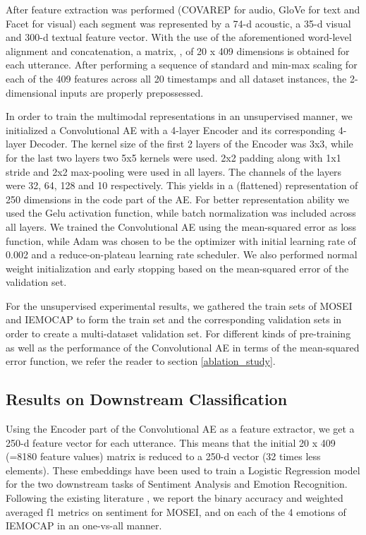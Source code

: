 After feature extraction was performed (COVAREP \cite{degottex2014covarep} for audio, GloVe \cite{pennington2014glove} for text and Facet \cite{imotions} for visual) each segment was represented by a 74-d acoustic, a 35-d visual and 300-d textual feature vector. With the use of the aforementioned word-level alignment and concatenation, a matrix, , of 20 x 409 dimensions is obtained for each utterance. After performing a sequence of standard and min-max scaling for each of the 409 features across all 20 timestamps and all dataset instances, the 2-dimensional inputs are properly prepossessed.

In order to train the multimodal representations in an unsupervised manner, we initialized a Convolutional AE with a 4-layer Encoder and its corresponding 4-layer Decoder. The kernel size of the first 2 layers of the Encoder was 3x3, while for the last two layers two 5x5 kernels were used. 2x2 padding along with 1x1 stride and 2x2 max-pooling were used in all layers. The channels of the layers were 32, 64, 128 and 10 respectively. This yields in a (flattened)  representation of 250 dimensions in the code part of the AE. For better representation ability we used the Gelu activation function, while batch normalization was included across all layers. We trained the Convolutional AE using the mean-squared error as loss function, while Adam was chosen to be the optimizer with initial learning rate of 0.002 and a reduce-on-plateau learning rate scheduler. We also performed normal weight initialization and early stopping based on the mean-squared error of the validation set.

For the unsupervised experimental results, we gathered the train sets of MOSEI and IEMOCAP to form the train set and the corresponding validation sets in order to create a multi-dataset validation set. For different kinds of pre-training as well as the performance of the Convolutional AE in terms of the mean-squared error function, we refer the reader to section \ref{ablation_study}.

\subsection{Results on Downstream Classification}


Using the Encoder part of the Convolutional AE as a feature extractor, we get a 250-d feature vector for each utterance. This means that the initial 20 x 409 (=8180 feature values) matrix is reduced to a 250-d vector (32 times less elements). These embeddings have been used to train a Logistic Regression model for the two downstream tasks of Sentiment Analysis and Emotion Recognition. Following the existing literature \cite{zadeh2018multi, zadeh2018memory, zadeh2017tensor, wang2019words, zadeh2018multimodal, liu2018efficient, tsai2019multimodal, tsai2019learning,  chauhan-etal-2019-context, sun2020learning}, we report the binary accuracy and weighted averaged f1 metrics on sentiment for MOSEI, and on each of the 4 emotions of IEMOCAP in an one-vs-all manner.

